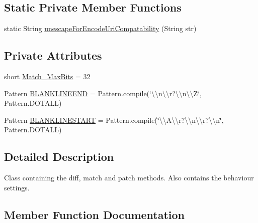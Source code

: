 \subsection*{Static Private Member Functions}
\begin{DoxyCompactItemize}
\item 
static String \hyperlink{classname_1_1fraser_1_1neil_1_1plaintext_1_1diff__match__patch_ab3998bacdd5babaa80fd01d05543e9fd}{unescape\+For\+Encode\+Uri\+Compatability} (String str)
\end{DoxyCompactItemize}
\subsection*{Private Attributes}
\begin{DoxyCompactItemize}
\item 
short \hyperlink{classname_1_1fraser_1_1neil_1_1plaintext_1_1diff__match__patch_a0ace68631fde71f6abcefc522b9472e7}{Match\+\_\+\+Max\+Bits} = 32
\item 
Pattern \hyperlink{classname_1_1fraser_1_1neil_1_1plaintext_1_1diff__match__patch_a2470986fdf096e4dd2382281db1a9009}{B\+L\+A\+N\+K\+L\+I\+N\+E\+E\+ND} = Pattern.\+compile(\char`\"{}\textbackslash{}\textbackslash{}n\textbackslash{}\textbackslash{}r?\textbackslash{}\textbackslash{}n\textbackslash{}\textbackslash{}Z\char`\"{}, Pattern.\+D\+O\+T\+A\+LL)
\item 
Pattern \hyperlink{classname_1_1fraser_1_1neil_1_1plaintext_1_1diff__match__patch_a6d4b186e2812cefeb3efc68da2015ea4}{B\+L\+A\+N\+K\+L\+I\+N\+E\+S\+T\+A\+RT} = Pattern.\+compile(\char`\"{}\textbackslash{}\textbackslash{}A\textbackslash{}\textbackslash{}r?\textbackslash{}\textbackslash{}n\textbackslash{}\textbackslash{}r?\textbackslash{}\textbackslash{}n\char`\"{}, Pattern.\+D\+O\+T\+A\+LL)
\end{DoxyCompactItemize}


\subsection{Detailed Description}
Class containing the diff, match and patch methods. Also contains the behaviour settings. 

\subsection{Member Function Documentation}
